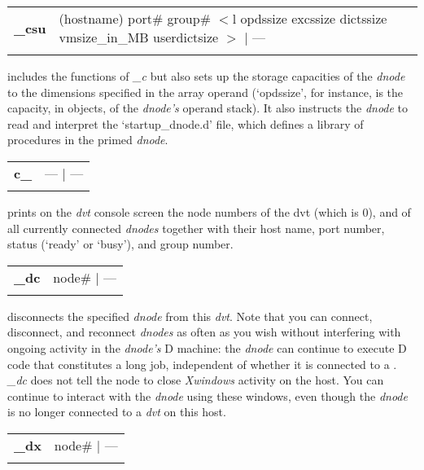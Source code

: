 \begin{tabular}{>{\sffamily\bfseries}p{1cm}>{\sffamily}p{9cm}}
\_csu    & (hostname) port\# group\# $<$l opdssize excssize dictssize vmsize\_in\_MB userdictsize $>$ $|$ ---\\\\
\end{tabular}

\noindent includes the functions of \emph{\_c} but also sets up the storage capacities of the \emph{dnode} to the dimensions specified in the array operand (`opdssize', for instance, is the capacity, in objects, of the \emph{dnode's} operand stack). It also instructs the \emph{dnode} to read and interpret the `startup\_dnode.d' file, which defines a library of procedures in the primed \emph{dnode}.\\

\begin{tabular}{>{\sffamily\bfseries}l>{\sffamily}l}
c\_    & --- $|$ ---\\\\
\end{tabular}

\noindent prints on the \emph{dvt} console screen the node numbers of the dvt (which is $0$), and of all currently connected \emph{dnodes} together with their host name, port number, status (`ready' or `busy'), and group number.\\  


\begin{tabular}{>{\sffamily\bfseries}l>{\sffamily}l}
\_dc    & node\#  $|$ ---\\\\
\end{tabular}

\noindent disconnects the specified \emph{dnode} from this \emph{dvt}. Note that you can connect, disconnect, and reconnect \emph{dnodes} as often as you wish without interfering with ongoing activity in the \emph{dnode's} D machine: the \emph{dnode} can continue to execute D code that constitutes a long job, independent of whether it is connected to a . \emph{\_dc} does not tell the node to close \emph{Xwindows} activity on the  host. You can continue to interact with the \emph{dnode} using these windows, even though the \emph{dnode} is no longer connected to a \emph{dvt} on this host.\\

\begin{tabular}{>{\sffamily\bfseries}l>{\sffamily}l}
\_dx    & node\#  $|$ ---\\\\
\end{tabular}

